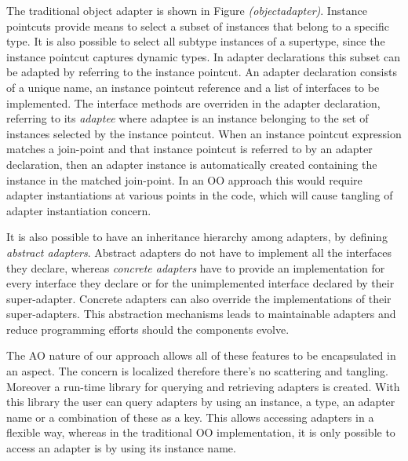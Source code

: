 \documentclass{llncs}
\begin{document}
The traditional object adapter is shown in Figure \textsl{(objectadapter)}. Instance pointcuts provide means to select a subset of instances that belong to a specific type. It is also possible to select all subtype instances of a supertype, since the instance pointcut captures dynamic types. In adapter declarations this subset can be adapted by referring to the instance pointcut. An adapter declaration consists of a unique name, an instance pointcut reference and a list of interfaces to be implemented. The interface methods are overriden in the adapter declaration, referring to its \emph{adaptee} where adaptee is an instance belonging to the set of instances selected by the instance pointcut. When an instance pointcut expression matches a join-point and that instance pointcut is referred to by an adapter declaration, then an adapter instance is automatically created containing the instance in the matched join-point.  In an OO approach this would require adapter instantiations at various points in the code, which will cause tangling of adapter instantiation concern. 

It is also possible to have an inheritance hierarchy among adapters, by defining \emph{abstract adapters}. Abstract adapters do not have to implement all the interfaces they declare, whereas \emph{concrete adapters} have to provide an implementation for every interface they declare or for the unimplemented interface declared by their super-adapter. Concrete adapters can also override the implementations of their super-adapters. This abstraction mechanisms leads to maintainable adapters and reduce programming efforts should the components evolve.

The AO nature of our approach allows all of these features to be encapsulated in an aspect. The concern is localized therefore there's no scattering and tangling. Moreover a run-time library for querying and retrieving adapters is created. With this library the user can query adapters by using an instance, a type, an adapter name or a combination of these as a key. This allows accessing adapters in a flexible way, whereas in the traditional OO implementation, it is only possible to access an adapter is by using its instance name.  
\end{document}
